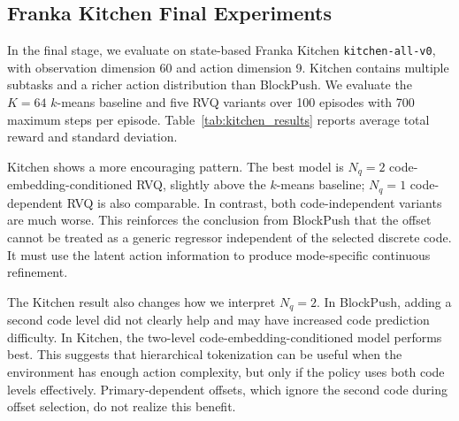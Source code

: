 \documentclass[conference]{IEEEtran}
\begin{document}
\subsection{Franka Kitchen Final Experiments}

In the final stage, we evaluate on state-based Franka Kitchen \texttt{kitchen-all-v0}, with observation dimension 60 and action dimension 9. Kitchen contains multiple subtasks and a richer action distribution than BlockPush. We evaluate the $K{=}64$ $k$-means baseline and five RVQ variants over 100 episodes with 700 maximum steps per episode. Table~\ref{tab:kitchen_results} reports average total reward and standard deviation.

\begin{table}[t]
\centering
\caption{Franka Kitchen evaluation over 100 episodes.}
\label{tab:kitchen_results}
\end{table}

Kitchen shows a more encouraging pattern. The best model is $N_q{=}2$ code-embedding-conditioned RVQ, slightly above the $k$-means baseline; $N_q{=}1$ code-dependent RVQ is also comparable. In contrast, both code-independent variants are much worse. This reinforces the conclusion from BlockPush that the offset cannot be treated as a generic regressor independent of the selected discrete code. It must use the latent action information to produce mode-specific continuous refinement.

The Kitchen result also changes how we interpret $N_q{=}2$. In BlockPush, adding a second code level did not clearly help and may have increased code prediction difficulty. In Kitchen, the two-level code-embedding-conditioned model performs best. This suggests that hierarchical tokenization can be useful when the environment has enough action complexity, but only if the policy uses both code levels effectively. Primary-dependent offsets, which ignore the second code during offset selection, do not realize this benefit.
\end{document}
